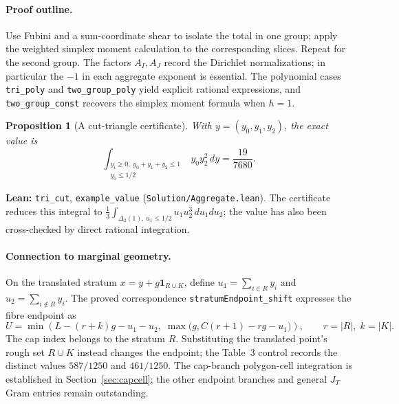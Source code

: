 \documentclass[11pt]{article}
\newtheorem{proposition}[theorem]{Proposition}
\newcommand{\code}[1]{\texttt{#1}}
\begin{document}
\paragraph{Proof outline.}
Use Fubini and a sum-coordinate shear to isolate the total in one group;
apply the weighted simplex moment calculation to the corresponding slices.
Repeat for the second group. The factors $A_I,A_J$ record the Dirichlet
normalizations; in particular the $-1$ in each aggregate exponent is essential.
The polynomial cases \code{tri\_poly} and \code{two\_group\_poly} yield
explicit rational expressions, and \code{two\_group\_const} recovers the
simplex moment formula when $h=1$.

\begin{proposition}[A cut-triangle certificate]\label{prop:aggregate-example}
With $y=(y_0,y_1,y_2)$, the exact value is
\[
 \int_{\substack{y_i\ge0,\;y_0+y_1+y_2\le1\\y_0\le 1/2}}
 y_0y_2^2\,dy=\frac{19}{7680}.
\]
\end{proposition}
\noindent\textbf{Lean:} \code{tri\_cut}, \code{example\_value}
(\nolinkurl{Solution/Aggregate.lean}). The certificate reduces this integral
to $\tfrac13\int_{\Delta_2(1),\,u_1\le1/2}u_1u_2^3\,du_1du_2$;
the value has also been cross-checked by direct rational integration.

\paragraph{Connection to marginal geometry.}
On the translated stratum $x=y+g\mathbf 1_{R\cup K}$, define
$u_1=\sum_{i\in R}y_i$ and $u_2=\sum_{i\notin R}y_i$.
The proved correspondence \code{stratumEndpoint\_shift} expresses the
fibre endpoint as
\[
 U=\min\!\left(L-(r+k)g-u_1-u_2,\;
 \max\bigl(g,C(r+1)-rg-u_1\bigr)\right),
 \qquad r=|R|,\;k=|K|.
\]
The cap index belongs to the stratum $R$. Substituting the translated point's
rough set $R\cup K$ instead changes the endpoint; the Table~3 control records
the distinct values $587/1250$ and $461/1250$.
The cap-branch polygon-cell integration is established in Section~\ref{sec:capcell}; the other endpoint branches and general $J_T$ Gram entries remain outstanding.
\end{document}
